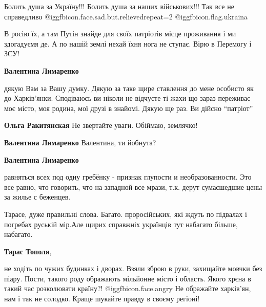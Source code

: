 \begin{itemize}
\begin{itemize}
\end{itemize} %


Болить душа за Україну!!! Болить душа за наших військових!!! Так все не
справедливо  @igg{fbicon.face.sad.but.relieved}{repeat=2}
@igg{fbicon.flag.ukraina}


В росію їх, а там Путін знайде для своїх патріотів місце проживання і ми
здогадуємя де. А по нашій землі нехай їхня нога не ступає. Вірю в Перемогу і
ЗСУ!

\begin{itemize} %
\textbf{Валентина Лимаренко} 

дякую Вам за Вашу думку. Дякую за таке щире ставлення до мене особисто як до
Харків'янки. Сподіваюсь ви ніколи не відчуєте ті жахи що зараз переживає моє
місто, моя родина, мої друзі в знайомі. Дякую ще раз. Ви дійсно \enquote{патріот}

\textbf{Ольга Ракитянская} Не звертайте уваги. Обіймаю, землячко!

\textbf{Валентина Лимаренко} Валентина, ти йобнута?

\textbf{Валентина Лимаренко} 

равняться всех под одну гребёнку - признак глупости и необразованности. Это все
равно, что говорить, что на западной все мрази, т.к. дерут сумасшедшие цены за
жилье с беженцев.

\end{itemize} %


Тарасе, дуже правильні слова. Багато. проросійських, які ждуть по підвалах і
погребах руській мір.Але щирих справжніх українців тут набагато більше,
набагато.

\textbf{Тарас Тополя},

не ходіть по чужих будинках і дворах. Взяли зброю в руки, захищайте мовчки без
піару. Пости, такого роду ображають мільйонне місто і область. Якого хрєна в
такий час розколювати країну?! @igg{fbicon.face.angry}  Не ображайте харків'ян, нам і так не солодко.
Краще шукайте правду в своєму регіоні!


\end{itemize} %
